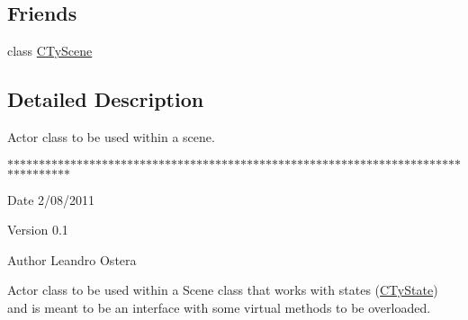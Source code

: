 \subsection*{Friends}
\begin{DoxyCompactItemize}
\item 
\hypertarget{class_i_ty_actor_ac9e603148a462b197c336bd2dedd9f87}{
class \hyperlink{class_i_ty_actor_ac9e603148a462b197c336bd2dedd9f87}{CTyScene}}
\label{class_i_ty_actor_ac9e603148a462b197c336bd2dedd9f87}

\end{DoxyCompactItemize}


\subsection{Detailed Description}
Actor class to be used within a scene. 

$\ast$$\ast$$\ast$$\ast$$\ast$$\ast$$\ast$$\ast$$\ast$$\ast$$\ast$$\ast$$\ast$$\ast$$\ast$$\ast$$\ast$$\ast$$\ast$$\ast$$\ast$$\ast$$\ast$$\ast$$\ast$$\ast$$\ast$$\ast$$\ast$$\ast$$\ast$$\ast$$\ast$$\ast$$\ast$$\ast$$\ast$$\ast$$\ast$$\ast$$\ast$$\ast$$\ast$$\ast$$\ast$$\ast$$\ast$$\ast$$\ast$$\ast$$\ast$$\ast$$\ast$$\ast$$\ast$$\ast$$\ast$$\ast$$\ast$$\ast$$\ast$$\ast$$\ast$$\ast$$\ast$$\ast$$\ast$$\ast$$\ast$$\ast$$\ast$$\ast$$\ast$$\ast$$\ast$$\ast$$\ast$$\ast$$\ast$$\ast$$\ast$$\ast$

\begin{DoxyDate}{Date}
2/08/2011 
\end{DoxyDate}
\begin{DoxyVersion}{Version}
0.1 
\end{DoxyVersion}
\begin{DoxyAuthor}{Author}
Leandro Ostera
\end{DoxyAuthor}
Actor class to be used within a Scene class that works with states (\hyperlink{class_i_ty_actor_1_1_c_ty_state}{CTyState}) and is meant to be an interface with some virtual methods to be overloaded. 

